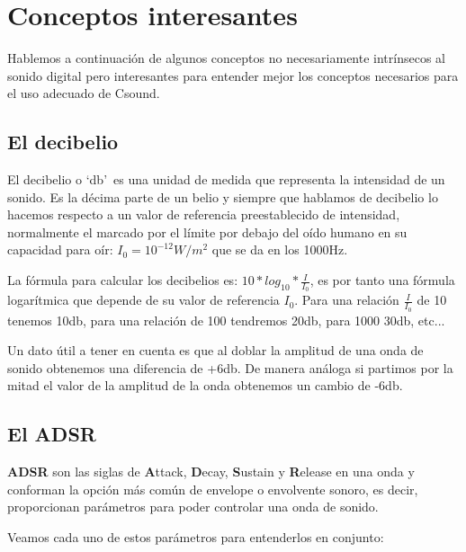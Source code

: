 
\section{Conceptos interesantes}\label{sec:Conceptos} 

Hablemos a continuación de algunos conceptos no necesariamente intrínsecos al sonido digital pero interesantes para entender mejor los conceptos necesarios para el uso adecuado de Csound.

\subsection{El decibelio}\label{sec:db} 

El decibelio o `db'\ es una unidad de medida que representa la intensidad de un sonido. Es la décima parte de un belio y siempre que hablamos de decibelio lo hacemos respecto a un valor de referencia preestablecido de intensidad, normalmente el marcado por el límite por debajo del oído humano en su capacidad para oír: \( I_{0} = 10^{-12}W/m^2 \) que se da en los 1000Hz.

La fórmula para calcular los decibelios es: \( 10*log_{10}* \frac{I}{I_{0}} \), es por tanto una fórmula logarítmica que depende de su valor de referencia 
\( I_{0} \). Para una relación \( \frac{I}{I_{0}} \) de 10 tenemos 10db, para una relación de 100 tendremos 20db, para 1000 30db, etc...

Un dato útil a tener en cuenta es que al doblar la amplitud de una onda de sonido obtenemos una diferencia de +6db. De manera análoga si partimos por la mitad el valor de la amplitud de la onda obtenemos un cambio de -6db.

\subsection{El ADSR}\label{sec:ADSR} 

\textbf{ADSR} son las siglas de \textbf{A}ttack, \textbf{D}ecay, \textbf{S}ustain y \textbf{R}elease en una onda y conforman la opción más común de envelope o envolvente sonoro, es decir, proporcionan parámetros para poder controlar una onda de sonido.

Veamos cada uno de estos parámetros para entenderlos en conjunto:

